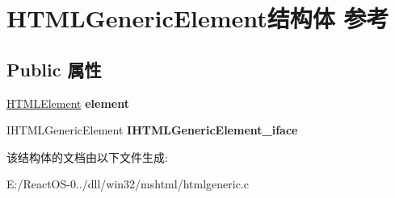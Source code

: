 \hypertarget{struct_h_t_m_l_generic_element}{}\section{H\+T\+M\+L\+Generic\+Element结构体 参考}
\label{struct_h_t_m_l_generic_element}
\subsection*{Public 属性}
\begin{DoxyCompactItemize}
\item 
\mbox{\label{struct_h_t_m_l_generic_element_a2f4548a3b77501b84df44e4f524b95d6}} 
\hyperlink{struct_h_t_m_l_element}{H\+T\+M\+L\+Element} {\bfseries element}
\item 
\mbox{\label{struct_h_t_m_l_generic_element_a1f67c82e7eebee255339d728a2be824b}} 
I\+H\+T\+M\+L\+Generic\+Element {\bfseries I\+H\+T\+M\+L\+Generic\+Element\+\_\+iface}
\end{DoxyCompactItemize}


该结构体的文档由以下文件生成\+:\begin{DoxyCompactItemize}
\item 
E\+:/\+React\+O\+S-\/0../dll/win32/mshtml/htmlgeneric.\+c\end{DoxyCompactItemize}
